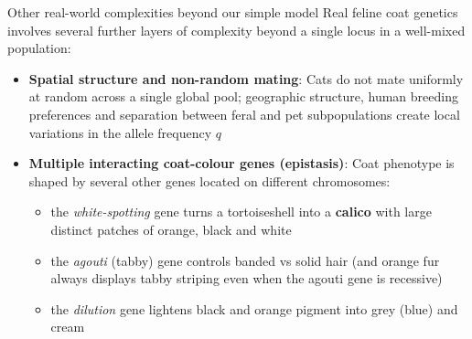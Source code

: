 \documentclass[aspectratio=169]{beamer}\usepackage[]{graphicx}\usepackage[]{xcolor}
\begin{document}
\begin{frame}{Other real-world complexities beyond our simple model}
Real feline coat genetics involves several further layers of complexity beyond a single locus in a well-mixed population:
\vfill
\begin{itemize}
\item \textbf{Spatial structure and non-random mating}:
Cats do not mate uniformly at random across a single global pool; geographic structure, human breeding preferences and separation between feral and pet subpopulations create local variations in the allele frequency $q$
\vfill
\item \textbf{Multiple interacting coat-colour genes (epistasis)}:
Coat phenotype is shaped by several other genes located on different chromosomes:
\begin{itemize}
\item the \emph{white-spotting} gene turns a tortoiseshell into a \textbf{calico} with large distinct patches of orange, black and white
\item the \emph{agouti} (tabby) gene controls banded vs solid hair (and orange fur always displays tabby striping even when the agouti gene is recessive)
\item the \emph{dilution} gene lightens black and orange pigment into grey (blue) and cream
\end{itemize}
\end{itemize}
\end{frame}
\end{document}
